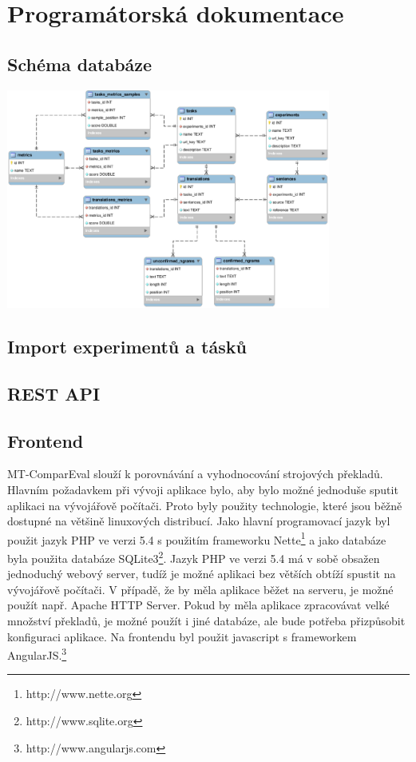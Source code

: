 \chapter{Programátorská dokumentace}
\label{chap:programmers}

\section{Schéma databáze}
\centerline{\mbox{\includegraphics[width=0.8\textwidth]{img/schema.eps}}}
\section{Import experimentů a tásků}
\section{REST API}
\section{Frontend}

MT-ComparEval slouží k porovnávání a vyhodnocování strojových překladů.
Hlavním požadavkem při vývoji aplikace bylo,
  aby bylo možné jednoduše sputit aplikaci na vývojářově počítači.
Proto byly použity technologie,
  které jsou běžně dostupné na většině linuxových distribucí.
Jako hlavní programovací jazyk byl použit jazyk PHP ve verzi 5.4 
  s použitím frameworku Nette\footnote{http://www.nette.org}
  a jako databáze byla použita databáze SQLite3\footnote{http://www.sqlite.org}.
Jazyk PHP ve verzi 5.4 má v sobě obsažen jednoduchý webový server,
  tudíž je možné aplikaci bez větších obtíží spustit na vývojářově počítači.
V případě, že by měla aplikace běžet na serveru,
  je možné použít např. Apache HTTP Server.
Pokud by měla aplikace zpracovávat velké množství překladů,
  je možné použít i jiné databáze,
  ale bude potřeba přizpůsobit konfiguraci aplikace.
Na frontendu byl použit javascript s frameworkem AngularJS.\footnote{http://www.angularjs.com}


